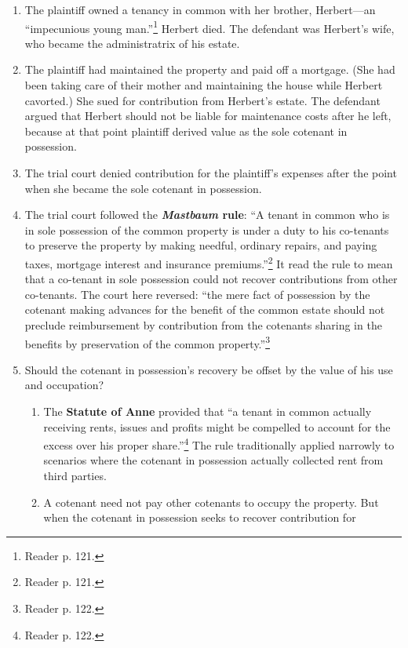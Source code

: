 \begin{enumerate}
    \item The plaintiff owned a tenancy in common with her brother, 
    Herbert---an ``impecunious young man.''\footnote{Reader p. 121.} Herbert 
    died. The defendant was Herbert's wife, who became the administratrix of 
    his estate.
    \item The plaintiff had maintained the property and paid off a mortgage. 
    (She had been taking care of their mother and maintaining the house while 
    Herbert cavorted.) She sued for contribution from Herbert's estate. 
    The defendant argued that Herbert should not be liable for maintenance 
    costs after he left, because at that point plaintiff derived value as the 
    sole cotenant in possession.
    \item The trial court denied contribution for the plaintiff's expenses 
    after the point when she became the sole cotenant in possession.
    \item The trial court followed the \textbf{\emph{Mastbaum} rule}: ``A 
    tenant in common who is in sole possession of the common property is under 
    a duty to his co-tenants to preserve the property by making needful, 
    ordinary repairs, and paying taxes, mortgage interest and insurance 
    premiums.''\footnote{Reader p. 121.} It read the rule to mean that a 
    co-tenant in sole possession could not recover contributions from other 
    co-tenants. The court here reversed: ``the mere fact of possession by the 
    cotenant making advances for the benefit of the common estate should not 
    preclude reimbursement by contribution from the cotenants sharing in the 
    benefits by preservation of the common property.''\footnote{Reader p.  
    122.}
    \item Should the cotenant in possession's recovery be offset by the value 
    of his use and occupation?
    \begin{enumerate}
        \item The \textbf{Statute of Anne} provided that ``a tenant in common 
        actually receiving rents, issues and profits might be compelled to 
        account for the excess over his proper share.''\footnote{Reader p. 
        122.} The rule traditionally applied narrowly to scenarios where 
        the cotenant in possession actually collected rent from third parties.  
        \item A cotenant need not pay other cotenants to occupy the property. 
        But when the cotenant in possession seeks to recover contribution for 

\end{enumerate}
\end{enumerate}
